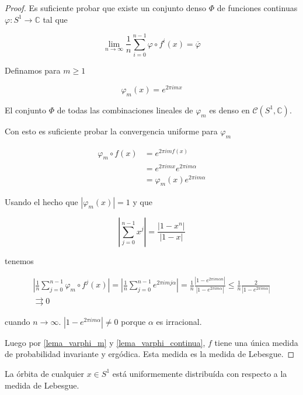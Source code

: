 \begin{proof}
	Es suficiente probar que existe un conjunto denso $\Phi$ de funciones continuas $\varphi: S^1 \rightarrow \mathbb{C}$ tal que
	
	\begin{equation}
		\lim_{n \rightarrow \infty} \frac{1}{n} \sum_{i=0}^{n-1} \varphi \circ f^i(x) = \overline{\varphi}
	\end{equation}
	
	Definamos para $m \geq 1$
	
	\begin{equation}
		\varphi_m(x) = e^{2\pi imx}
	\end{equation}
	
	El conjunto $\Phi$ de todas las combinaciones lineales de $\varphi_m$ es denso en $\mathcal{C}(S^1,\mathbb{C})$.
	
	Con esto es suficiente probar la convergencia uniforme para $\varphi_m$
	
	\begin{align}
		\varphi_m \circ f(x) &= e^{2\pi imf(x)}\\
		&= e^{2\pi imx} e^{2\pi im\alpha}\\
		&= \varphi_m(x) e^{2\pi im\alpha}
	\end{align}
	
	Usando el hecho que $|\varphi_m(x)|=1$ y que
	
	\begin{equation}
		\left| \sum_{j=0}^{n-1} x^j \right| = \frac{|1-x^n|}{|1-x|}
	\end{equation}
	
	tenemos
	
	\begin{multline}
		\left| \frac{1}{n} \sum_{j=0}^{n-1} \varphi_m \circ f^j(x) \right| = \left| \frac{1}{n} \sum_{j=0}^{n-1} e^{2\pi imj\alpha} \right| = \frac{1}{n} \frac{|1-e^{2\pi im\alpha n}|}{|1-e^{2\pi im\alpha}|} \leq \frac{1}{n} \frac{2}{|1-e^{2\pi im\alpha}|}\\
		\rightrightarrows 0
	\end{multline}
	
	cuando $n \rightarrow \infty$. $|1-e^{2\pi im\alpha}| \neq 0$ porque $\alpha$ es irracional.
	
	Luego por \ref{lema_varphi_m} y \ref{lema_varphi_continua}, $f$ tiene una única medida de probabilidad invariante y ergódica. Esta medida es la medida de Lebesgue.
\end{proof}

\begin{teorema}
  La órbita de cualquier $ x \in S^1 $ está uniformemente distribuída con respecto a la medida de Lebesgue.
\end{teorema}


